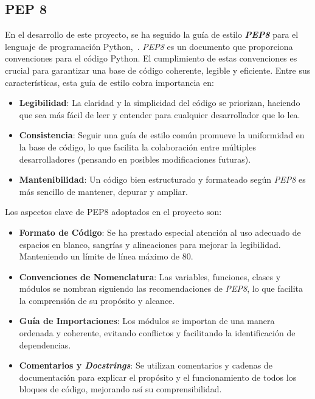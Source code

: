 \subsection{PEP 8}
En el desarrollo de este proyecto, se ha seguido la guía de estilo \textbf{\textit{PEP8}} para el lenguaje de programación Python,~\cite{Guia:PEP8}. \textit{PEP8} es un documento que proporciona convenciones para el código Python. El cumplimiento de estas convenciones es crucial para garantizar una base de código coherente, legible y eficiente.  
Entre sus características, esta guía de estilo cobra importancia en:
\begin{itemize}
	\item \textbf{Legibilidad}: La claridad y la simplicidad del código se priorizan, haciendo que sea más fácil de leer y entender para cualquier desarrollador que lo lea.
	\item \textbf{Consistencia}: Seguir una guía de estilo común promueve la uniformidad en la base de código, lo que facilita la colaboración entre múltiples desarrolladores (pensando en posibles modificaciones futuras).
	\item \textbf{Mantenibilidad}: Un código bien estructurado y formateado según \textit{PEP8} es más sencillo de mantener, depurar y ampliar.
\end{itemize}
Los aspectos clave de PEP8 adoptados en el proyecto son:
\begin{itemize}
	\item \textbf{Formato de Código}: Se ha prestado especial atención al uso adecuado de espacios en blanco, sangrías y alineaciones para mejorar la legibilidad. Manteniendo un límite de línea máximo de 80.
	\item \textbf{Convenciones de Nomenclatura}: Las variables, funciones, clases y módulos se nombran siguiendo las recomendaciones de \textit{PEP8}, lo que facilita la comprensión de su propósito y alcance.
	\item \textbf{Guía de Importaciones}: Los módulos se importan de una manera ordenada y coherente, evitando conflictos y facilitando la identificación de dependencias.
	\item \textbf{Comentarios y \textit{Docstrings}}: Se utilizan comentarios y cadenas de documentación para explicar el propósito y el funcionamiento de todos los bloques de código, mejorando así su comprensibilidad.
\end{itemize}

